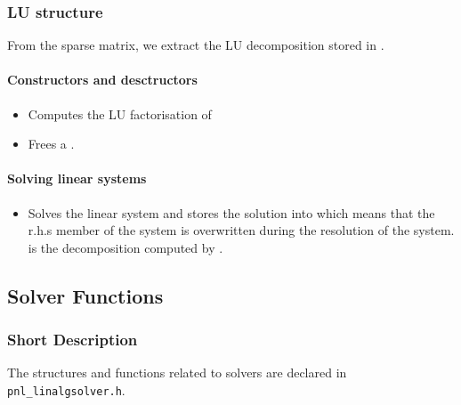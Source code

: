 \subsubsection{LU structure}

From the sparse matrix, we extract the LU decomposition stored in .
\paragraph{Constructors and desctructors}
\begin{itemize}
\item {}
  \sshortdescribe Computes the LU factorisation of 

\item {}
  \sshortdescribe Frees a .
\end{itemize}

\paragraph{Solving linear systems}

\begin{itemize}
\item {}
  \sshortdescribe Solves the linear system  and stores the solution 
  into  which means that the r.h.s member of the system is overwritten
  during the resolution of the system.  is the decomposition computed by
  .
\end{itemize}


\subsection{Solver Functions}
\subsubsection{Short Description}

The structures and functions related to solvers are declared in
\verb!pnl_linalgsolver.h!. 

